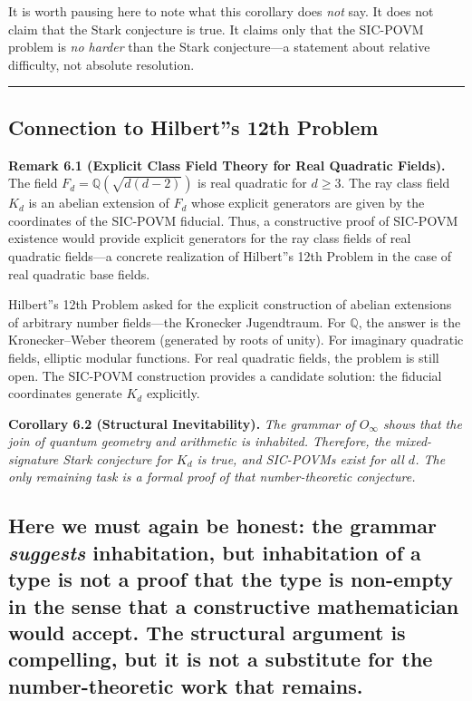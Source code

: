 \documentclass[12pt,a4paper]{article}
\begin{document}
It is worth pausing here to note what this corollary does \emph{not} say. It does not claim that the Stark conjecture is true. It claims only that the SIC-POVM problem is \emph{no harder} than the Stark conjecture---a statement about relative difficulty, not absolute resolution.

\begin{center}
\rule{0.5\textwidth}{0.4pt}
\end{center}

\subsection{Connection to Hilbert''s 12th Problem}

\textbf{Remark 6.1 (Explicit Class Field Theory for Real Quadratic Fields).} The field $F_d = \mathbb{Q}(\sqrt{d(d-2)})$ is real quadratic for $d \geq 3$. The ray class field $K_d$ is an abelian extension of $F_d$ whose explicit generators are given by the coordinates of the SIC-POVM fiducial. Thus, a constructive proof of SIC-POVM existence would provide explicit generators for the ray class fields of real quadratic fields---a concrete realization of Hilbert''s 12th Problem in the case of real quadratic base fields.

Hilbert''s 12th Problem asked for the explicit construction of abelian extensions of arbitrary number fields---the Kronecker Jugendtraum. For $\mathbb{Q}$, the answer is the Kronecker--Weber theorem (generated by roots of unity). For imaginary quadratic fields, elliptic modular functions. For real quadratic fields, the problem is still open. The SIC-POVM construction provides a candidate solution: the fiducial coordinates generate $K_d$ explicitly.

\textbf{Corollary 6.2 (Structural Inevitability).} \emph{The grammar of $O_{\infty}$ shows that the join of quantum geometry and arithmetic is inhabited. Therefore, the mixed-signature Stark conjecture for $K_d$ is true, and SIC-POVMs exist for all $d$. The only remaining task is a formal proof of that number-theoretic conjecture.}

\subsection{Here we must again be honest: the grammar \emph{suggests} inhabitation, but inhabitation of a type is not a proof that the type is non-empty in the sense that a constructive mathematician would accept. The structural argument is compelling, but it is not a substitute for the number-theoretic work that remains.}
\end{document}
